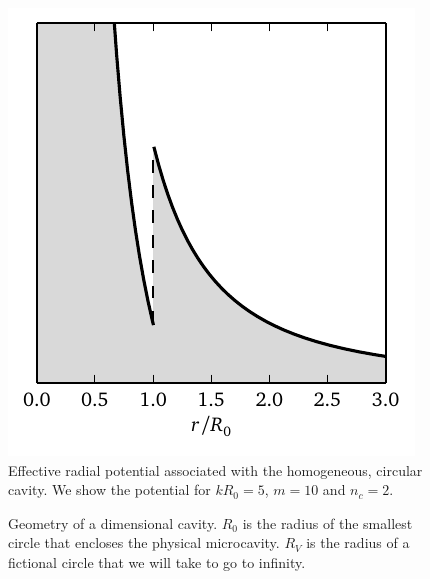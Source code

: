\begin{figure}
	\centering
	\includegraphics{figs/passive/quantumPotential.pdf}
	\caption[Effective radial potential associated with the homogeneous, circular cavity]
			{Effective radial potential associated with the homogeneous, circular cavity.
			We show the potential for $kR_0=5$, $m=10$ and $n_c=2$.}
	\label{fig:passive.formalism.quantumConnection}
\end{figure}

\begin{figure}
 \centering
 \def\svgwidth{0.4\textwidth}
 
 \caption[Geometry of a bidimensional cavity]
	 {Geometry of a dimensional cavity. $R_0$ is the radius of the smallest circle
	 that encloses the physical microcavity. $R_V$ is the radius of a fictional circle
	 that we will take to go to infinity.}
\end{figure}


